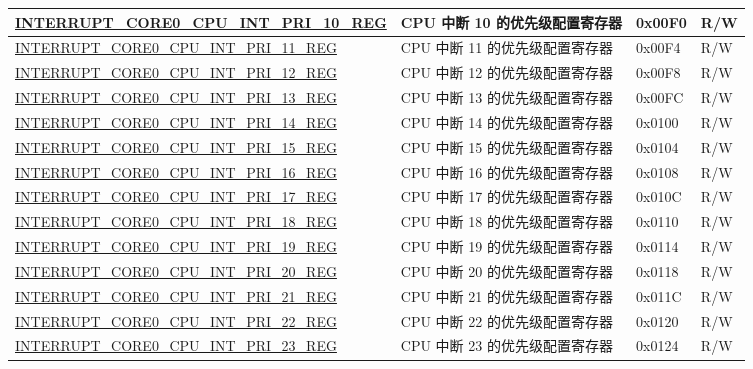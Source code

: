 \begin{longtable}{ | p{10cm} | m{10cm} | m{1.3cm} | m{1.0cm} | }
\hyperref[regdesc:INTERRUPTCORE0CPUINTPRI0REG]{INTERRUPT\_CORE0\_CPU\_INT\_PRI\_10\_REG} & CPU 中断 10 的优先级配置寄存器 & 0x00F0 & R/W \\ \hline
\hyperref[regdesc:INTERRUPTCORE0CPUINTPRI0REG]{INTERRUPT\_CORE0\_CPU\_INT\_PRI\_11\_REG} & CPU 中断 11 的优先级配置寄存器 & 0x00F4 & R/W \\ \hline
\hyperref[regdesc:INTERRUPTCORE0CPUINTPRI0REG]{INTERRUPT\_CORE0\_CPU\_INT\_PRI\_12\_REG} & CPU 中断 12 的优先级配置寄存器 & 0x00F8 & R/W \\ \hline
\hyperref[regdesc:INTERRUPTCORE0CPUINTPRI0REG]{INTERRUPT\_CORE0\_CPU\_INT\_PRI\_13\_REG} & CPU 中断 13 的优先级配置寄存器 & 0x00FC & R/W \\ \hline
\hyperref[regdesc:INTERRUPTCORE0CPUINTPRI0REG]{INTERRUPT\_CORE0\_CPU\_INT\_PRI\_14\_REG} & CPU 中断 14 的优先级配置寄存器 & 0x0100 & R/W \\ \hline
\hyperref[regdesc:INTERRUPTCORE0CPUINTPRI0REG]{INTERRUPT\_CORE0\_CPU\_INT\_PRI\_15\_REG} & CPU 中断 15 的优先级配置寄存器 & 0x0104 & R/W \\ \hline
\hyperref[regdesc:INTERRUPTCORE0CPUINTPRI0REG]{INTERRUPT\_CORE0\_CPU\_INT\_PRI\_16\_REG} & CPU 中断 16 的优先级配置寄存器 & 0x0108 & R/W \\ \hline
\hyperref[regdesc:INTERRUPTCORE0CPUINTPRI0REG]{INTERRUPT\_CORE0\_CPU\_INT\_PRI\_17\_REG} & CPU 中断 17 的优先级配置寄存器 & 0x010C & R/W \\ \hline
\hyperref[regdesc:INTERRUPTCORE0CPUINTPRI0REG]{INTERRUPT\_CORE0\_CPU\_INT\_PRI\_18\_REG} & CPU 中断 18 的优先级配置寄存器 & 0x0110 & R/W \\ \hline
\hyperref[regdesc:INTERRUPTCORE0CPUINTPRI0REG]{INTERRUPT\_CORE0\_CPU\_INT\_PRI\_19\_REG} & CPU 中断 19 的优先级配置寄存器 & 0x0114 & R/W \\ \hline
\hyperref[regdesc:INTERRUPTCORE0CPUINTPRI0REG]{INTERRUPT\_CORE0\_CPU\_INT\_PRI\_20\_REG} & CPU 中断 20 的优先级配置寄存器 & 0x0118 & R/W \\ \hline
\hyperref[regdesc:INTERRUPTCORE0CPUINTPRI0REG]{INTERRUPT\_CORE0\_CPU\_INT\_PRI\_21\_REG} & CPU 中断 21 的优先级配置寄存器 & 0x011C & R/W \\ \hline
\hyperref[regdesc:INTERRUPTCORE0CPUINTPRI0REG]{INTERRUPT\_CORE0\_CPU\_INT\_PRI\_22\_REG} & CPU 中断 22 的优先级配置寄存器 & 0x0120 & R/W \\ \hline
\hyperref[regdesc:INTERRUPTCORE0CPUINTPRI0REG]{INTERRUPT\_CORE0\_CPU\_INT\_PRI\_23\_REG} & CPU 中断 23 的优先级配置寄存器 & 0x0124 & R/W \\ \hline

\end{longtable}
